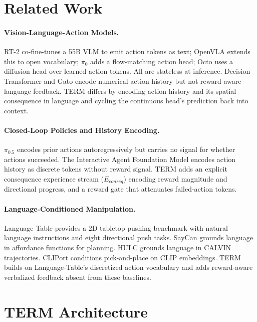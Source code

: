 \documentclass[letterpaper]{article} %
\begin{document}
\section{Related Work}

\paragraph{Vision-Language-Action Models.}
RT-2 \cite{brohan2023rt2} co-fine-tunes a 55B VLM to emit action tokens as text; OpenVLA \cite{kim2024openvla} extends this to open vocabulary; $\pi_0$ \cite{black2024pi0} adds a flow-matching action head; Octo \cite{octo2024} uses a diffusion head over learned action tokens. All are stateless at inference. Decision Transformer \cite{chen2021decision} and Gato \cite{reed2022gato} encode numerical action history but not reward-aware language feedback. TERM differs by encoding action history and its spatial consequence in language and cycling the continuous head's prediction back into context.

\paragraph{Closed-Loop Policies and History Encoding.}
$\pi_{0.5}$ \cite{hejna2025pi05} encodes prior actions autoregressively but carries no signal for whether actions succeeded. The Interactive Agent Foundation Model \cite{durante2024agent} encodes action history as discrete tokens without reward signal. TERM adds an explicit consequence experience stream ($E_{conseq}$) encoding reward magnitude and directional progress, and a reward gate that attenuates failed-action tokens.

\paragraph{Language-Conditioned Manipulation.}
Language-Table \cite{lynch2023languagetable} provides a 2D tabletop pushing benchmark with natural language instructions and eight directional push tasks. SayCan \cite{ahn2022saycan} grounds language in affordance functions for planning. HULC \cite{mees2022hulc} grounds language in CALVIN trajectories. CLIPort \cite{radford2021clip} conditions pick-and-place on CLIP embeddings. TERM builds on Language-Table's discretized action vocabulary and adds reward-aware verbalized feedback absent from these baselines.

\section{TERM Architecture}
\end{document}
